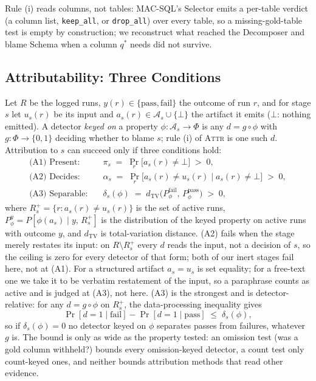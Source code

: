 \documentclass{llncs}
\begin{document}
Rule (i) reads columns, not tables: MAC-SQL's Selector emits a per-table
verdict (a column list, \texttt{keep\_all}, or \texttt{drop\_all}) over every
table, so a missing-gold-table test is empty by construction; we reconstruct
what reached the Decomposer and blame Schema when a column $q^\ast$ needs did
not survive.

\subsection{Attributability: Three Conditions}
\label{sec:conditions}

Let $R$ be the logged runs, $y(r)\in\{\mathrm{pass},\mathrm{fail}\}$ the
outcome of run $r$, and for stage $s$ let $u_s(r)$ be its input and
$a_s(r)\in\mathcal{A}_s\cup\{\bot\}$ the artifact it emits ($\bot$: nothing
emitted). A detector \emph{keyed on} a property $\phi:\mathcal{A}_s\to\Phi$
is any $d=g\circ\phi$ with $g:\Phi\to\{0,1\}$ deciding whether to blame $s$;
rule (i) of \textsc{Attr} is one such $d$. Attribution to $s$ can succeed
only if three conditions hold:
\begin{align}
\text{(A1) Present:}\quad & \pi_s \;=\; \Pr_r\bigl[a_s(r)\neq\bot\bigr] \;>\; 0,
\label{eq:a1}\\
\text{(A2) Decides:}\quad & \alpha_s \;=\; \Pr_r\bigl[a_s(r)\neq u_s(r)\;\big|\;
a_s(r)\neq\bot\bigr] \;>\; 0, \label{eq:a2}\\
\text{(A3) Separable:}\quad & \delta_s(\phi) \;=\;
d_{\mathrm{TV}}\bigl(P^{\mathrm{fail}}_{\phi},\,P^{\mathrm{pass}}_{\phi}\bigr)
\;>\; 0, \label{eq:a3}
\end{align}
where $R_s^{+}=\{r: a_s(r)\neq u_s(r)\}$ is the set of active runs,
$P^{y}_{\phi}=P[\phi(a_s)\mid y,\,R_s^{+}]$ is the distribution of the keyed
property on active runs with outcome $y$, and $d_{\mathrm{TV}}$ is
total-variation distance. (A2) fails when the stage
merely restates its input: on $R\setminus R_s^{+}$ every $d$ reads the input,
not a decision of $s$, so the ceiling is zero for every detector of that form;
both of our inert stages fail here, not at (A1). For a structured artifact
$a_s = u_s$ is set equality; for a free-text one we take it to be verbatim
restatement of the input, so a paraphrase counts as active and is judged at
(A3), not here. (A3) is the strongest and is
detector-relative: for any $d=g\circ\phi$ on $R_s^{+}$, the data-processing
inequality gives
\begin{equation}
\Pr[d{=}1\mid\mathrm{fail}]-\Pr[d{=}1\mid\mathrm{pass}] \;\le\; \delta_s(\phi),
\label{eq:bound}
\end{equation}
so if $\delta_s(\phi)=0$ no detector keyed on $\phi$ separates passes
from failures, whatever $g$ is. The bound is only as wide as the property
tested: an omission test (was a gold column withheld?) bounds every
omission-keyed detector, a count test only count-keyed ones, and neither
bounds attribution methods that read other evidence.
\end{document}
